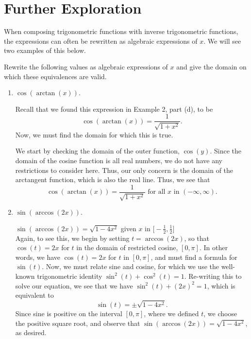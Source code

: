 \documentclass{ximera}
\begin{document}



\section{Further Exploration}

When composing trigonometric functions with inverse trigonometric functions, the expressions can often be rewritten as algebraic expressions of $x$. We will see two examples of this below.

\begin{example}
Rewrite the following values as algebraic expressions of $x$ and give the domain on which these equivalences are valid.
\begin{enumerate}
\item $\cos(\arctan(x))$.\\
%
\begin{explanation}
Recall that we found this expression in Example 2, part (d), to be
$$\cos(\arctan(x)) = \frac{1}{\sqrt{1+x^2}}.$$ %
%
Now, we must find the domain for which this is true.

We start by checking the domain of the outer function, $\cos(y)$. Since the domain of the cosine function is all real numbers, we do not have any restrictions to consider here. Thus, our only concern is the domain of the arctangent function, which is also the real line. Thus, we see that 
$$\cos(\arctan(x)) = \frac{1}{\sqrt{1+x^2}} \text{ for all } x \text{ in } (-\infty, \infty).$$  
\end{explanation}
%
\item $\sin(\arccos(2x))$. \\
%
\begin{explanation}
$\sin(\arccos(2x)) = \sqrt{1-4x^2}$ given $x$ in $\Big[-\!\frac{1}{2}, \frac{1}{2}\Big]$\\
%
Again, to see this, we begin by setting $t = \arccos(2x)$, so that $\cos(t) = 2x$ for $t$ in the domain of restricted cosine, $[0,\pi]$. In other words, we have $\cos(t) = 2x$ for $t$ in $[0, \pi]$, and must find a formula for $\sin(t)$. Now, we must relate sine and cosine, for which we use the well-known trigonometric identity $\sin^2(t) + \cos^2(t) = 1$. Re-writing this to solve our equation, we see that we have $\sin^2(t) + (2x)^2 =1$, which is equivalent to 
%
$$\sin(t) = \pm \sqrt{1-4x^2}.$$
%
Since sine is positive on the interval $[0,\pi]$, where we defined $t$, we choose the positive square root, and observe that $\sin(\arccos(2x)) = \sqrt{1-4x^2}$, as desired.


\end{explanation}
\end{enumerate}
\end{example}
\end{document}
